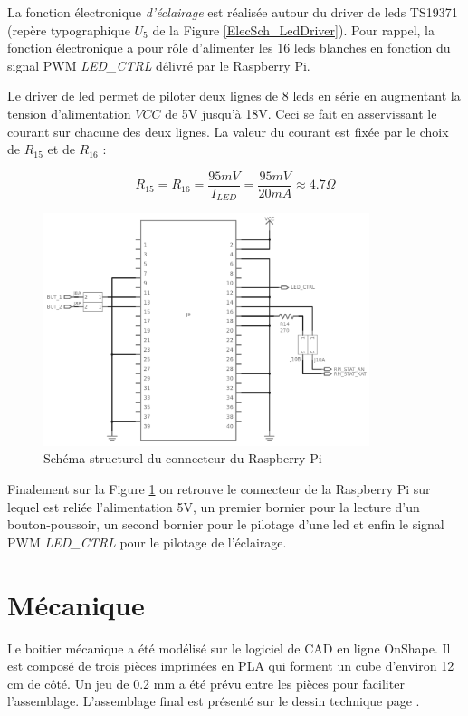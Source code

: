     La fonction électronique \emph{d'éclairage} est réalisée autour du driver de leds TS19371 (repère typographique $U_5$ de la Figure \ref{ElecSch_LedDriver}).
    Pour rappel, la fonction électronique a pour rôle d'alimenter les 16 leds blanches en fonction du signal PWM \emph{LED\_CTRL} délivré par le Raspberry Pi.
    
    Le driver de led permet de piloter deux lignes de 8 leds en série en augmentant la tension d'alimentation $VCC$ de 5V jusqu'à 18V.
    Ceci se fait en asservissant le courant sur chacune des deux lignes.
    La valeur du courant est fixée par le choix de $R_{15}$ et de $R_{16}$ :
    
\begin{equation}
R_{15} = R_{16} = \frac{95 mV}{I_{LED}} = \frac{95 mV}{20 mA} \approx 4.7 \Omega
\end{equation}

\begin{figure}[H]
    \centerline{
        \includegraphics[width=0.85\textwidth,fbox]{img/ElecSch_RPiConn}
    }
    \caption{Schéma structurel du connecteur du Raspberry Pi}
    \label{ElecSch_RPiConn}
\end{figure}

Finalement sur la Figure \ref{ElecSch_RPiConn} on retrouve le connecteur de la Raspberry Pi sur lequel est reliée l'alimentation 5V, un premier bornier pour la lecture d'un bouton-poussoir, un second bornier pour le pilotage d'une led et enfin le signal PWM \emph{LED\_CTRL} pour le pilotage de l'éclairage.
    
    \section{Mécanique}
    Le boitier mécanique a été modélisé sur le logiciel de CAD en ligne OnShape.
    Il est composé de trois pièces imprimées en PLA qui forment un cube d'environ 12 cm de côté.
    Un jeu de 0.2 mm a été prévu entre les pièces pour faciliter l'assemblage.
    L'assemblage final est présenté sur le dessin technique page \pageref{mecdrawing}.
    
